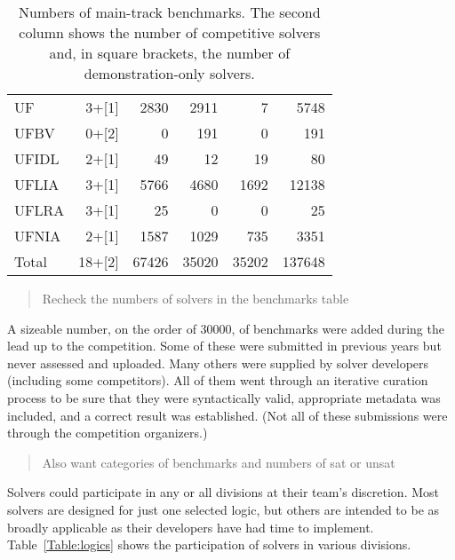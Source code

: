 \documentclass[twosize,11pt]{article}
\newcommand{\comment}[2]{\begin{quote}\sc #1\marginpar{\textcolor{red}{$\ast^{\mbox{#2}}$}}\end{quote}}
\newcommand{\davidc}[1]{\comment{#1}{DC}}
\begin{document}
\begin{table}
\begin{tabular}{|l|r|r|r|r|r|}
UF & 3+[1] & 2830 & 2911 & 7 & 5748 \\
UFBV & 0+[2] & 0 & 191 & 0 & 191 \\
UFIDL & 2+[1] & 49 & 12 & 19 & 80 \\
UFLIA & 3+[1] & 5766 & 4680 & 1692 & 12138 \\
UFLRA & 3+[1] & 25 & 0 & 0 & 25\\
UFNIA & 2+[1] & 1587 & 1029 & 735 & 3351 \\
\hline
Total & 18+[2] & 67426 & 35020 & 35202 & 137648 \\
\hline
\end{tabular}
\vspace{.2in}
\caption{Numbers of main-track benchmarks. The second column shows the number of competitive solvers and, in square brackets, the number of demonstration-only solvers.}
\label{Table:benchmarks}
\end{table}

\davidc{Recheck the numbers of solvers in the benchmarks table}

A sizeable number, on the order of 30000, of benchmarks were added during the lead up to the competition. Some of these were submitted in previous years but never assessed and uploaded. Many others were supplied by solver developers (including some competitors). All of them went through an iterative curation process to be sure that they were syntactically valid, appropriate metadata was included, and a correct result was established. (Not all of these submissions were through the competition organizers.)

\davidc{Also want categories of benchmarks and numbers of sat or unsat}

Solvers could participate in any or all divisions at their team's discretion. Most solvers are designed for just one selected logic, but others are intended to be as broadly applicable as their developers have had time to implement. Table~\ref{Table:logics} shows the participation of solvers in various divisions.
\end{document}
